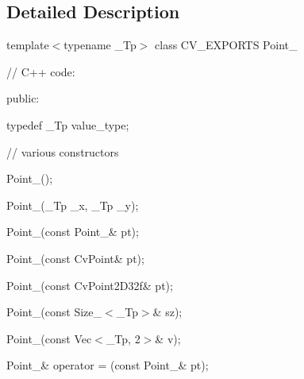 \subsection{Detailed Description}
template$<$typename \+\_\+\+Tp$>$ class C\+V\+\_\+\+E\+X\+P\+O\+R\+TS Point\+\_\+ {\ttfamily }

{\ttfamily }

{\ttfamily }

{\ttfamily // C++ code\+:}

{\ttfamily }

{\ttfamily }

{\ttfamily public\+:}

{\ttfamily }

{\ttfamily }

{\ttfamily typedef \+\_\+\+Tp value\+\_\+type;}

{\ttfamily }

{\ttfamily }

{\ttfamily // various constructors}

{\ttfamily }

{\ttfamily }

{\ttfamily Point\+\_\+();}

{\ttfamily }

{\ttfamily }

{\ttfamily Point\+\_\+(\+\_\+\+Tp \+\_\+x, \+\_\+\+Tp \+\_\+y);}

{\ttfamily }

{\ttfamily }

{\ttfamily Point\+\_\+(const Point\+\_\+\& pt);}

{\ttfamily }

{\ttfamily }

{\ttfamily Point\+\_\+(const Cv\+Point\& pt);}

{\ttfamily }

{\ttfamily }

{\ttfamily Point\+\_\+(const Cv\+Point2\+D32f\& pt);}

{\ttfamily }

{\ttfamily }

{\ttfamily Point\+\_\+(const Size\+\_\+$<$\+\_\+\+Tp$>$\& sz);}

{\ttfamily }

{\ttfamily }

{\ttfamily Point\+\_\+(const Vec$<$\+\_\+\+Tp, 2$>$\& v);}

{\ttfamily }

{\ttfamily }

{\ttfamily Point\+\_\+\& operator = (const Point\+\_\+\& pt);}

